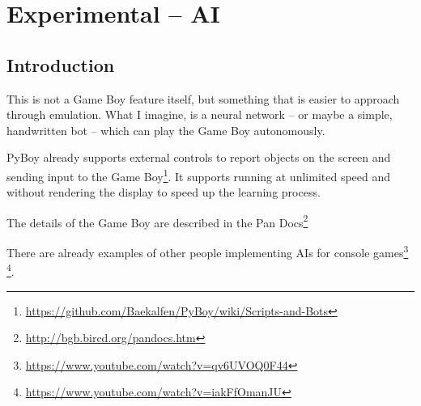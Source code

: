 \documentclass[11pt]{report} %
\begin{document}

\chapter*{Experimental -- AI}
\section*{Introduction}
This is not a Game Boy feature itself, but something that is easier to approach through emulation. What I imagine, is a neural network -- or maybe a simple, handwritten bot -- which can play the Game Boy autonomously.

PyBoy already supports external controls to report objects on the screen and sending input to the Game Boy\footnote{\url{https://github.com/Baekalfen/PyBoy/wiki/Scripts-and-Bots}}. It supports running at unlimited speed and without rendering the display to speed up the learning process.

The details of the Game Boy are described in the Pan Docs\footnote{\url{http://bgb.bircd.org/pandocs.htm}}

There are already examples of other people implementing AIs for console games\footnote{\url{https://www.youtube.com/watch?v=qv6UVOQ0F44}} \footnote{\url{https://www.youtube.com/watch?v=iakFfOmanJU}}.
\end{document}
